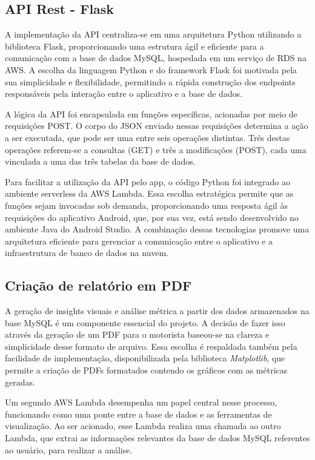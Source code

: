     \subsection{API Rest - Flask}
    A implementação da API centraliza-se em uma arquitetura Python utilizando a biblioteca Flask, proporcionando uma estrutura ágil e eficiente para a comunicação com a base de dados MySQL, hospedada em um serviço de RDS na AWS. A escolha da linguagem Python e do framework Flask foi motivada pela sua simplicidade e flexibilidade, permitindo a rápida construção dos endpoints responsáveis pela interação entre o aplicativo e a base de dados.

    A lógica da API foi encapsulada em funções específicas, acionadas por meio de requisições POST. O corpo do JSON enviado nessas requisições determina a ação a ser executada, que pode ser uma entre seis operações distintas. Três destas operações referem-se a consultas (GET) e três a modificações (POST), cada uma vinculada a uma das três tabelas da base de dados.

    Para facilitar a utilização da API pelo app, o código Python foi integrado ao ambiente serverless da AWS Lambda. Essa escolha estratégica permite que as funções sejam invocadas sob demanda, proporcionando uma resposta ágil às requisições do aplicativo Android, que, por sua vez, está sendo desenvolvido no ambiente Java do Android Studio. A combinação dessas tecnologias promove uma arquitetura eficiente para gerenciar a comunicação entre o aplicativo e a infraestrutura de banco de dados na nuvem.


    \subsection{Criação de relatório em PDF}
    
    A geração de insights visuais e análise métrica a partir dos dados armazenados na base MySQL é um componente essencial do projeto. A decisão de fazer isso através da geração de um PDF para o motorista baseou-se na clareza e simplicidade desse formato de arquivo. Essa escolha é respaldada também pela facilidade de implementação, disponibilizada pela biblioteca \textit{Matplotlib}, que permite a criação de PDFs formatados contendo os gráficos com as métricas geradas.
    
    Um segundo AWS Lambda desempenha um papel central nesse processo, funcionando como uma ponte entre a base de dados e as ferramentas de visualização. Ao ser acionado, esse Lambda realiza uma chamada ao outro Lambda, que extrai as informações relevantes da base de dados MySQL referentes ao usuário, para realizar a análise.

